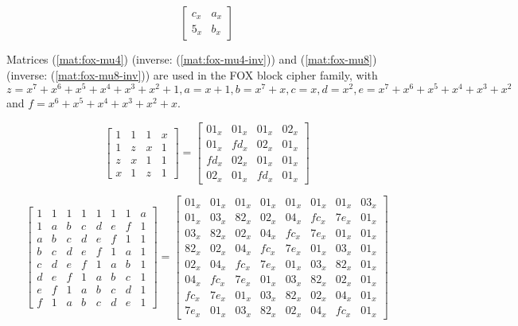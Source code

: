 \begin{equation}\label{mat:hierocrypt-l1-higher-inv}
\begin{bmatrix}
c_x & a_x\\
5_x & b_x
\end{bmatrix}
\end{equation}

Matrices (\ref{mat:fox-mu4}) (inverse: (\ref{mat:fox-mu4-inv})) and (\ref{mat:fox-mu8}) (inverse: (\ref{mat:fox-mu8-inv})) are used in the FOX block cipher family, with $z = x^7+x^6+x^5+x^4+x^3+x^2+1, a = x+1, b = x^7+x, c = x, d = x^2, e = x^7+x^6+x^5+x^4+x^3+x^2$ and $f = x^6+x^5+x^4+x^3+x^2+x$.

\begin{equation}\label{mat:fox-mu4}
\begin{bmatrix}
1 & 1 & 1 & x\\
1 & z & x & 1\\
z & x & 1 & 1\\
x & 1 & z & 1
\end{bmatrix}
=
\begin{bmatrix}
01_x & 01_x & 01_x & 02_x\\
01_x & fd_x & 02_x & 01_x\\
fd_x & 02_x & 01_x & 01_x\\
02_x & 01_x & fd_x & 01_x
\end{bmatrix}
\end{equation}

\begin{equation}\label{mat:fox-mu8}
\begin{bmatrix}
1 & 1 & 1 & 1 & 1 & 1 & 1 & a\\
1 & a & b & c & d & e & f & 1\\
a & b & c & d & e & f & 1 & 1\\
b & c & d & e & f & 1 & a & 1\\
c & d & e & f & 1 & a & b & 1\\
d & e & f & 1 & a & b & c & 1\\
e & f & 1 & a & b & c & d & 1\\
f & 1 & a & b & c & d & e & 1
\end{bmatrix}
=
\begin{bmatrix}
01_x & 01_x & 01_x & 01_x & 01_x & 01_x & 01_x & 03_x\\
01_x & 03_x & 82_x & 02_x & 04_x & fc_x & 7e_x & 01_x\\
03_x & 82_x & 02_x & 04_x & fc_x & 7e_x & 01_x & 01_x\\
82_x & 02_x & 04_x & fc_x & 7e_x & 01_x & 03_x & 01_x\\
02_x & 04_x & fc_x & 7e_x & 01_x & 03_x & 82_x & 01_x\\
04_x & fc_x & 7e_x & 01_x & 03_x & 82_x & 02_x & 01_x\\
fc_x & 7e_x & 01_x & 03_x & 82_x & 02_x & 04_x & 01_x\\
7e_x & 01_x & 03_x & 82_x & 02_x & 04_x & fc_x & 01_x
\end{bmatrix}
\end{equation}

